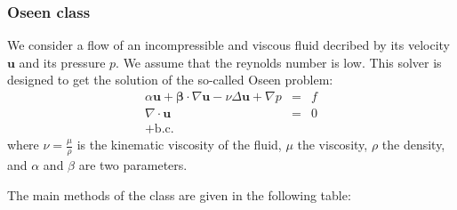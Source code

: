 \documentclass[11pt]{article}
\begin{document}
\subsubsection{Oseen class}
We consider a flow of an incompressible and viscous fluid decribed by its velocity $\mathbf{u}$ and its pressure $p$. We assume that the reynolds number is low. This solver is designed to get the solution of the so-called Oseen problem:
\begin{eqnarray}
\alpha\mathbf{u}+\boldsymbol{\beta}\cdot\nabla\mathbf{u}-\nu\Delta\mathbf{u} + \nabla p & = & f\\
\nabla\cdot\mathbf{u} & = & 0\\
+\text{b.c.}\nonumber
\end{eqnarray}
where $\nu=\frac{\mu}{\rho}$ is the kinematic viscosity of the fluid, $\mu$ the viscosity, $\rho$ the density, and $\alpha$ and $\beta$ are two parameters.

The main methods of the class are given in the following table:
\end{document}
